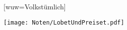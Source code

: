 [wuw={Volkstümlich}]

\beginverse
\endverse
\centering\texttt{[image: Noten/LobetUndPreiset.pdf]}

\endsong
